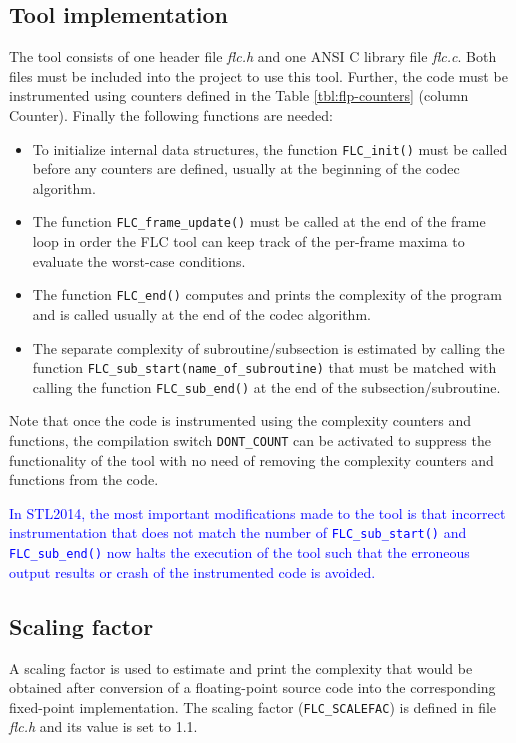 \subsection{Tool implementation}
The tool consists of one header file \textit{flc.h} and one ANSI C library
file \textit{flc.c}. Both files must be included into the project to use
this tool. Further, the code must be instrumented using counters defined
in the Table \ref{tbl:flp-counters} (column Counter). Finally the following
functions are needed:
\begin{itemize}
\item To initialize internal data structures, the function
{\tt FLC\_init()} must be called before any counters are defined,
usually at the beginning of the codec algorithm.
\item The function {\tt FLC\_frame\_update()} must be called at the
end of the frame loop in order the FLC tool can keep track of the
per-frame maxima to evaluate the worst-case conditions.
\item The function {\tt FLC\_end()} computes and prints the complexity
of the program and is called usually at the end of the codec algorithm.
\item The separate complexity of subroutine/subsection is estimated by
calling the function {\tt FLC\_sub\_start(name\_of\_subroutine)} that
must be matched with calling the function {\tt FLC\_sub\_end()} at
the end of the subsection/subroutine.
\end{itemize}

Note that once the code is instrumented using the complexity counters
and functions, the compilation switch {\tt DONT\_COUNT} can be
activated to suppress the functionality of the tool with no need of
removing the complexity counters and functions from the code.

\textcolor{blue}{
%
In STL2014, the most important modifications made to the tool is
that incorrect instrumentation that does not match the number of
{\tt FLC\_sub\_start()} and {\tt FLC\_sub\_end()} now halts the
execution of the tool such that the erroneous output results or
crash of the instrumented code is avoided.
%
}

\subsection{Scaling factor}
A scaling factor is used to estimate and print the complexity that
would be obtained after conversion of a floating-point source code
into the corresponding fixed-point implementation. The scaling factor
({\tt FLC\_SCALEFAC}) is defined in file \textit{flc.h} and its value
is set to 1.1.

